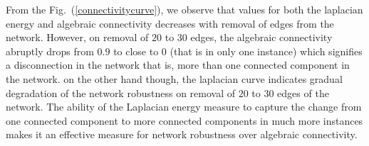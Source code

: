 \documentclass[10pt,a4paper]{article}
\begin{document}
From the Fig.~(\ref{connectivitycurve}), we observe that values for both the laplacian energy and algebraic connectivity decreases with removal of edges from the network. However, on removal of $20$ to $30$ edges, the algebraic connectivity abruptly drops from $0.9$ to close to $0$ (that is in only one instance) which signifies a disconnection in the network that is, more than one connected component in the network. on the other hand though, the laplacian curve indicates gradual degradation of the network robustness on removal of $20$ to $30$ edges of the network. The ability of the Laplacian energy measure to capture the change from one connected component to more connected components in much more instances makes it an effective measure for network robustness over algebraic connectivity.

\renewcommand{\bibname}{References}
\nocite{*}


\end{document}
